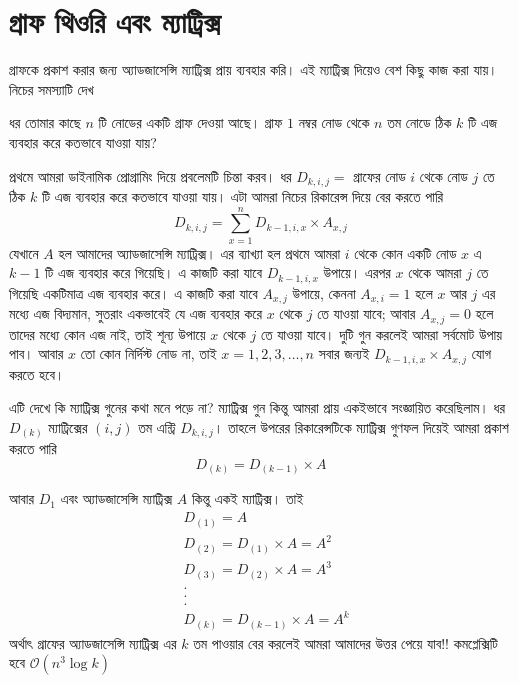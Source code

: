 \section{গ্রাফ থিওরি এবং ম্যাট্রিক্স}
গ্রাফকে প্রকাশ করার জন্য অ্যাডজাসেন্সি ম্যাট্রিক্স প্রায় ব্যবহার করি। এই ম্যাট্রিক্স দিয়েও বেশ কিছু কাজ করা যায়। নিচের সমস্যাটি দেখ
\begin{problem}
ধর তোমার কাছে $n$ টি নোডের একটি গ্রাফ দেওয়া আছে। গ্রাফ $1$ নম্বর নোড থেকে $n$ তম নোডে ঠিক $k$ টি এজ ব্যবহার করে কতভাবে যাওয়া যায়?
\end{problem}
\begin{solution}
প্রথমে আমরা ডাইনামিক প্রোগ্রামিং দিয়ে প্রবলেমটি চিন্তা করব। ধর $D_{k, i, j} = $ গ্রাফের নোড $i$ থেকে নোড $j$ তে ঠিক $k$ টি এজ ব্যবহার করে কতভাবে যাওয়া যায়।  এটা আমরা নিচের রিকারেন্স দিয়ে বের করতে পারি
$$ D_{k, i, j} = \sum_{x = 1}^{n} D_{k - 1, i, x} \times A_{x, j} $$
যেখানে $A$ হল আমাদের অ্যাডজাসেন্সি ম্যাট্রিক্স। এর ব্যাখ্যা হল প্রথমে আমরা $i$ থেকে কোন একটি নোড $x$ এ $k - 1$ টি এজ ব্যবহার করে গিয়েছি। এ কাজটি করা যাবে $D_{k - 1, i, x}$ উপায়ে। এরপর $x$ থেকে আমরা $j$ তে গিয়েছি একটিমাত্র এজ ব্যবহার করে। এ কাজটি করা যাবে $A_{x, j}$ উপায়ে, কেননা $A_{x, i} = 1$ হলে $x$ আর $j$ এর মধ্যে এজ বিদ্যমান, সুতরাং একভাবেই যে এজ ব্যবহার করে $x$ থেকে $j$ তে যাওয়া যাবে; আবার $A_{x, j} = 0$ হলে তাদের মধ্যে কোন এজ নাই, তাই শূন্য উপায়ে $x$ থেকে $j$ তে যাওয়া যাবে। দুটি গুন করলেই আমরা সর্বমোট উপায় পাব। আবার $x$ তো কোন নির্দিস্ট নোড না, তাই $x = 1, 2, 3, \dots, n$ সবার জন্যই $ D_{k - 1, i, x} \times A_{x, j} $ যোগ করতে হবে।

এটি দেখে কি ম্যাট্রিক্স গুনের কথা মনে পড়ে না? ম্যাট্রিক্স গুন কিন্তু আমরা প্রায় একইভাবে সংজ্ঞায়িত করেছিলাম। ধর $D_{(k)}$ ম্যাট্রিক্সের $(i, j)$ তম এন্ট্রি $D_{k, i, j}$। তাহলে উপরের রিকারেন্সটিকে ম্যাট্রিক্স গুণফল দিয়েই আমরা প্রকাশ করতে পারি
$$ D_{(k)} = D_{(k - 1)} \times A$$

আবার $D_{1}$ এবং  অ্যাডজাসেন্সি ম্যাট্রিক্স $A$ কিন্তু একই ম্যাট্রিক্স। তাই
\begin{align*}
& D_{(1)} = A \\
& D_{(2)} = D_{(1)} \times A = A^2 \\
& D_{(3)} = D_{(2)} \times A = A^3 \\
& . \\
& . \\
& . \\
& D_{(k)} = D_{(k - 1)} \times A = A^k
\end{align*}
অর্থাৎ গ্রাফের  অ্যাডজাসেন্সি ম্যাট্রিক্স এর $k$ তম পাওয়ার বের করলেই আমরা আমাদের উত্তর পেয়ে যাব!! কমপ্লেক্সিটি হবে $\mathcal{O}(n^3\log{k})$
\end{solution}

